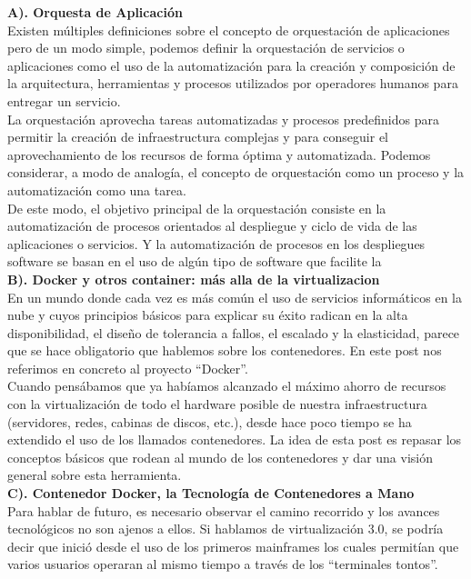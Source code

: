 \documentclass[twoside,twocolumn]{article}
\begin{document}
\begin{flushright}
\begin{itemize}
 \textbf{A). Orquesta de Aplicación }\\
\textbf{}Existen múltiples definiciones sobre el concepto de orquestación de aplicaciones pero de un modo simple, podemos definir la orquestación de servicios o aplicaciones como el uso de la automatización para la creación y composición de la arquitectura, herramientas y procesos utilizados por operadores humanos para entregar un servicio.\\
\textbf{}La orquestación aprovecha tareas automatizadas y procesos predefinidos para permitir la creación de infraestructura complejas y para conseguir el aprovechamiento de los recursos de forma óptima y automatizada. Podemos considerar, a modo de analogía, el concepto de orquestación como un proceso y la automatización como una tarea.\\
\textbf{}De este modo, el objetivo principal de la orquestación consiste en la automatización de procesos orientados al despliegue y ciclo de vida de las aplicaciones o servicios. Y la automatización de procesos en los despliegues software se basan en el uso de algún tipo de software que facilite la\\
 \textbf{B). Docker y otros container: más alla de la virtualizacion}\\
\textbf{}En un mundo donde cada vez es más común el uso de servicios informáticos en la nube y cuyos principios básicos para explicar su éxito radican en la alta disponibilidad, el diseño de tolerancia a fallos, el escalado y la elasticidad, parece que se hace obligatorio que hablemos sobre los contenedores. En este post nos referimos en concreto al proyecto “Docker”.\\
\textbf{}Cuando pensábamos que ya habíamos alcanzado el máximo ahorro de recursos con la virtualización de todo el hardware posible de nuestra infraestructura (servidores, redes, cabinas de discos, etc.), desde hace poco tiempo se ha extendido el uso de los llamados contenedores. La idea de esta post es repasar los conceptos básicos que rodean al mundo de los contenedores y dar una visión general sobre esta herramienta.\\
 \textbf{C). Contenedor Docker, la Tecnología de Contenedores a Mano}\\
\textbf{}Para hablar de futuro, es necesario observar el camino recorrido y los avances tecnológicos no son ajenos a ellos. Si hablamos de virtualización 3.0, se podría decir que inició desde el uso de los primeros mainframes los cuales permitían que varios usuarios operaran al mismo tiempo a través de los “terminales tontos”.\\

\end{itemize}
\end{flushright}
\end{document}
